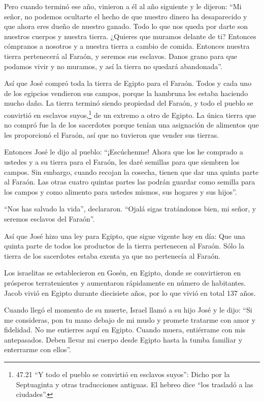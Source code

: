  Pero cuando terminó ese año, vinieron a él al año
siguiente y le dijeron: ``Mi señor, no podemos ocultarte el hecho de que
nuestro dinero ha desaparecido y que ahora eres dueño de nuestro ganado.
Todo lo que nos queda por darte son nuestros cuerpos y nuestra tierra.
 ¿Quieres que muramos delante de ti? Entonces cómpranos a
nosotros y a nuestra tierra a cambio de comida. Entonces nuestra tierra
pertenecerá al Faraón, y seremos sus esclavos. Danos grano para que
podamos vivir y no muramos, y así la tierra no quedará abandonada''.

 Así que José compró toda la tierra de Egipto para el
Faraón. Todos y cada uno de los egipcios vendieron sus campos, porque la
hambruna les estaba haciendo mucho daño. La tierra terminó siendo
propiedad del Faraón,  y todo el pueblo se convirtió en
esclavos suyos,\footnote{47.21 ``Y todo el pueblo se convirtió en
  esclavos suyos'': Dicho por la Septuaginta y otras traducciones
  antiguas. El hebreo dice ``los trasladó a las ciudades''.} de un
extremo a otro de Egipto.  La única tierra que no compró
fue la de los sacerdotes porque tenían una asignación de alimentos que
les proporcionó el Faraón, así que no tuvieron que vender sus tierras.

 Entonces José le dijo al pueblo: ``¡Escúchenme! Ahora que
los he comprado a ustedes y a su tierra para el Faraón, les daré
semillas para que siembren los campos.  Sin embargo, cuando
recojan la cosecha, tienen que dar una quinta parte al Faraón. Las otras
cuatro quintas partes las podrán guardar como semilla para los campos y
como alimento para ustedes mismos, sus hogares y sus hijos''.

 ``Nos has salvado la vida'', declararon. ``Ojalá sigas
tratándonos bien, mi señor, y seremos esclavos del Faraón''.

 Así que José hizo una ley para Egipto, que sigue vigente
hoy en día: Que una quinta parte de todos los productos de la tierra
pertenecen al Faraón. Sólo la tierra de los sacerdotes estaba exenta ya
que no pertenecía al Faraón.

 Los israelitas se establecieron en Gosén, en Egipto, donde
se convirtieron en prósperos terratenientes y aumentaron rápidamente en
número de habitantes.  Jacob vivió en Egipto durante
diecisiete años, por lo que vivió en total 137 años.

 Cuando llegó el momento de su muerte, Israel llamó a su
hijo José y le dijo: ``Si me consideras, pon tu mano debajo de mi muslo
y promete tratarme con amor y fidelidad. No me entierres aquí en Egipto.
 Cuando muera, entiérrame con mis antepasados. Deben llevar
mi cuerpo desde Egipto hasta la tumba familiar y enterrarme con ellos''.

